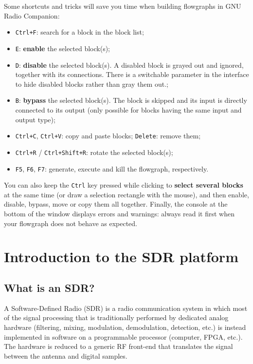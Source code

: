 Some shortcuts and tricks will save you time when building flowgraphs in GNU Radio Companion:
\begin{itemize}
    \item \texttt{Ctrl+F}: search for a block in the block list;
    \item \texttt{E}: \textbf{enable} the selected block(s);
    \item \texttt{D}: \textbf{disable} the selected block(s). A disabled block is grayed out and ignored, together with its connections. There is a switchable parameter in the interface to hide disabled blocks rather than gray them out.;
    \item \texttt{B}: \textbf{bypass} the selected block(s). The block is skipped and its input is directly connected to its output (only possible for blocks having the same input and output type);
    \item \texttt{Ctrl+C}, \texttt{Ctrl+V}: copy and paste blocks; \texttt{Delete}: remove them;
    \item \texttt{Ctrl+R} / \texttt{Ctrl+Shift+R}: rotate the selected block(s);
    \item \texttt{F5}, \texttt{F6}, \texttt{F7}: generate, execute and kill the flowgraph, respectively.
\end{itemize}
You can also keep the \texttt{Ctrl} key pressed while clicking to \textbf{select several blocks} at the same time (or draw a selection rectangle with the mouse), and then enable, disable, bypass, move or copy them all together. Finally, the console at the bottom of the window displays errors and warnings: always read it first when your flowgraph does not behave as expected.

\section{Introduction to the SDR platform}

\subsection{What is an SDR?}

A Software-Defined Radio (SDR) is a radio communication system in which most of the signal processing that is traditionally performed by dedicated analog hardware (filtering, mixing, modulation, demodulation, detection, etc.) is instead implemented in software on a programmable processor (computer, FPGA, etc.). The hardware is reduced to a generic RF front-end that translates the signal between the antenna and digital samples.

